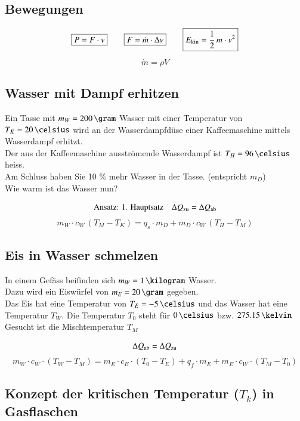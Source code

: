 \subsection{Bewegungen}

\vspace{-0.2cm}

\[\boxed{ P = F \cdot v } \qquad \boxed{F = \dot{m} \cdot \Delta v}\qquad \boxed{ E_{\rm kin} = \frac{1}{2} \, m \cdot v^2 } \]
\[\boxed{\dot{m} = \rho \dot{V}}\]


\subsection{Wasser mit Dampf erhitzen}

Ein Tasse mit $m_W = 200 \, \gram$ Wasser  mit einer Temperatur von $T_K = 20 \, \celsius$ wird an
der Wasserdampfdüse einer Kaffeemaschine mittels Wasserdampf erhitzt. \\
Der aus der Kaffeemaschine ausströmende Wasserdampf ist $T_H = 96 \, \celsius$ heiss. \\
Am Schluss haben Sie 10 \% mehr Wasser in der Tasse. (entspricht $m_D$)\\
Wie warm ist das Wasser nun?

$$ \text{Ansatz: 1. Hauptsatz} \quad \Delta Q_{\rm zu} = \Delta Q_{\rm ab} $$ 
$$ m_W \cdot c_W \, (T_M - T_K) = q_s \cdot m_D + m_D \cdot c_W \, (T_H - T_M) $$


\subsection{Eis in Wasser schmelzen}

In einem Gefäss beifinden sich $m_W = 1 \, \kilogram$ Wasser. \\
Dazu wird ein Eiswürfel von $m_E = 20 \, \gram$ gegeben. \\
Das Eis hat eine Temperatur von $T_E = -5 \, \celsius$ und das Wasser hat eine Temperatur $T_W$. Die Temperatur $T_0$ steht 
für $0 \, \celsius$ bzw. $275.15 \, \kelvin$ \\
Gesucht ist die Mischtemperatur $T_M$ 

$$ \Delta Q_{\rm ab} = \Delta Q_{\rm zu} $$
$$ m_W \cdot c_W \cdot (T_W - T_M) = m_E \cdot c_E \cdot (T_0 - T_E) + q_f \cdot m_E + m_E \cdot c_W \cdot (T_M - T_0) $$


\subsection[Konzept der kritischen Temperatur in Gasflaschen]
{Konzept der kritischen Temperatur ($T_k$) in Gasflaschen}

